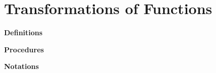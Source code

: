 \chapter{Transformations of Functions}
\begin{genericFrame}[frametitle={~New Things\hbox{~}}]
    \textbf{\Large\sffamily Definitions}

    \noindent\textbf{\Large\sffamily Procedures}

    \noindent\textbf{\Large\sffamily Notations}
\end{genericFrame}
